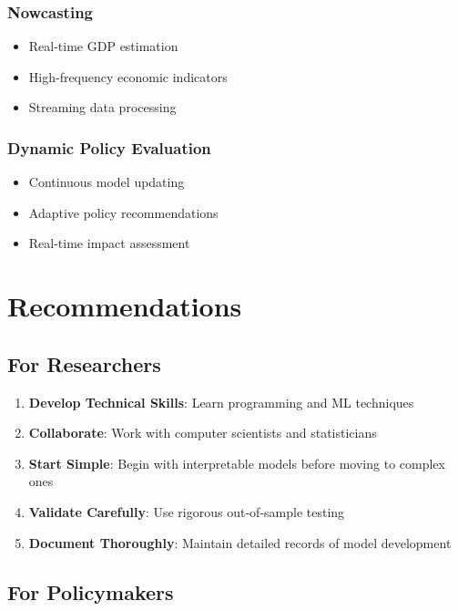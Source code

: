 \documentclass[12pt,a4paper]{article}
\begin{document}
\subsubsection{Nowcasting}
\begin{itemize}
    \item Real-time GDP estimation
    \item High-frequency economic indicators
    \item Streaming data processing
\end{itemize}

\subsubsection{Dynamic Policy Evaluation}
\begin{itemize}
    \item Continuous model updating
    \item Adaptive policy recommendations
    \item Real-time impact assessment
\end{itemize}

\section{Recommendations}

\subsection{For Researchers}

\begin{enumerate}
    \item \textbf{Develop Technical Skills}: Learn programming and ML techniques
    \item \textbf{Collaborate}: Work with computer scientists and statisticians
    \item \textbf{Start Simple}: Begin with interpretable models before moving to complex ones
    \item \textbf{Validate Carefully}: Use rigorous out-of-sample testing
    \item \textbf{Document Thoroughly}: Maintain detailed records of model development
\end{enumerate}

\subsection{For Policymakers}
\end{document}
